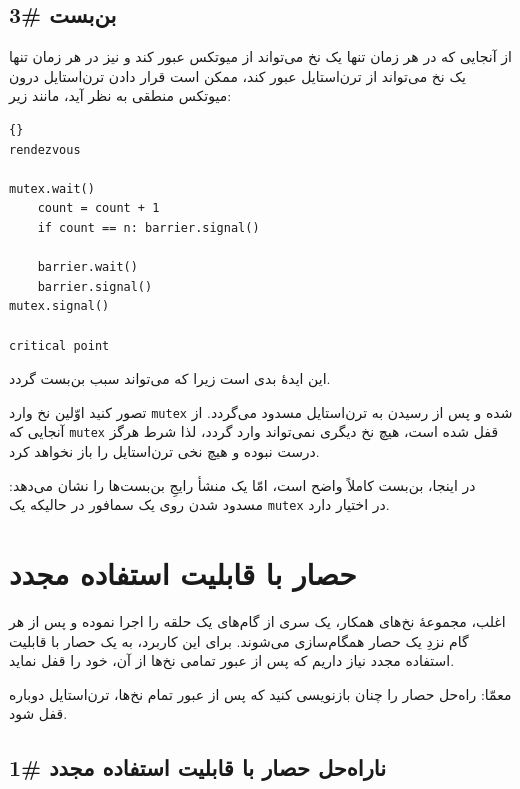 \documentclass{book}
\newcommand{\clearemptydoublepage}{\newpage\cleardoublepage}
\begin{document}
\clearemptydoublepage
\subsection {بن‌بست \#3}

    از آنجایی که در هر زمان تنها یک نخ می‌تواند از میوتکس عبور کند و نیز در هر زمان تنها یک نخ می‌تواند از ترن‌استایل عبور کند، 
    ممکن است قرار دادن ترن‌استایل درون میوتکس منطقی به نظر آید، مانند زیر: 
\begin{latin}
\begin{lstlisting}[title=\rl{راه‌حل بدِ حصار}]{}
rendezvous

mutex.wait()
    count = count + 1
    if count == n: barrier.signal()

    barrier.wait()
    barrier.signal()
mutex.signal()

critical point
\end{lstlisting}
\end{latin}

    این ایدهٔ بدی است زیرا که می‌تواند سبب بن‌بست گردد. 

    تصور کنید اوّلین نخ وارد \texttt{mutex} شده و پس از رسیدن به تر‌ن‌استایل مسدود می‌گردد. 
    از آنجایی که \texttt{mutex} قفل شده است، هیچ نخ دیگری نمی‌تواند وارد گردد، لذا شرط 
     هرگز درست نبوده و هیچ نخی ترن‌استایل را باز نخواهد کرد. 

    در اینجا، بن‌بست کاملاً واضح است، امّا یک منشأ رایجِ بن‌بست‌ها را نشان می‌دهد: مسدود شدن روی یک سمافور در حالیکه یک \texttt{mutex} در اختیار دارد. 

\section {حصار با قابلیت استفاده مجدد}
\label{rebar}

    اغلب، مجموعهٔ نخ‌های همکار، یک سری از گام‌های یک حلقه را اجرا نموده و پس از هر گام نزدِ یک حصار همگام‌سازی می‌شوند.
    برای این کاربرد، به یک حصار با قابلیت استفاده مجدد نیاز داریم که پس از عبور تمامی نخ‌ها از آن، خود را قفل نماید.  

    معمّا: راه‌حل حصار را چنان بازنویسی کنید که پس از عبور تمام نخ‌ها، ترن‌استایل دوباره قفل شود.

\clearemptydoublepage
\subsection{ ناراه‌حل حصار با قابلیت استفاده مجدد  \#1}
\end{document}
